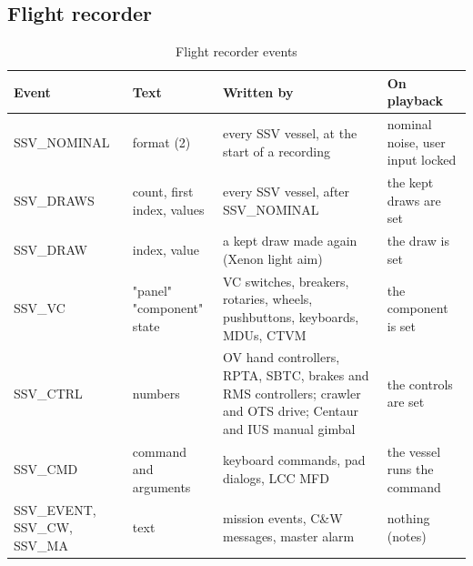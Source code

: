 \documentclass[Space_Shuttle_Vessel_Manual.tex]{subfiles}
\begin{document}
\subsection{Flight recorder}
\label{sec:flight-recorder}
\begin{table}[b!]
  \centering
  \begin{tabularx}{470pt}{>{\centering\arraybackslash}p{75pt} | >{\centering\arraybackslash}p{100pt} | >{\centering\arraybackslash}p{150pt} | >{\centering\arraybackslash}p{95pt}}
    \textbf{Event} & \textbf{Text} & \textbf{Written by} & \textbf{On playback} \\
    \hline
	SSV\_NOMINAL & format (2) & every SSV vessel, at the start of a recording & nominal noise, user input locked\\
	\hline\rule{0pt}{2ex}
	SSV\_DRAWS & count, first index, values & every SSV vessel, after SSV\_NOMINAL & the kept draws are set\\
	\hline\rule{0pt}{2ex}
	SSV\_DRAW & index, value & a kept draw made again (Xenon light aim) & the draw is set\\
	\hline\rule{0pt}{2ex}
	SSV\_VC & "panel" "component" state & VC switches, breakers, rotaries, wheels, pushbuttons, keyboards, MDUs, CTVM & the component is set\\
	\hline\rule{0pt}{2ex}
	SSV\_CTRL & numbers & OV hand controllers, RPTA, SBTC, brakes and RMS controllers; crawler and OTS drive; Centaur and IUS manual gimbal & the controls are set\\
	\hline\rule{0pt}{2ex}
	SSV\_CMD & command and arguments & keyboard commands, pad dialogs, LCC MFD & the vessel runs the command\\
	\hline\rule{0pt}{2ex}
	SSV\_EVENT, SSV\_CW, SSV\_MA & text & mission events, C\&W messages, master alarm & nothing (notes)
	\end{tabularx}
  \caption{Flight recorder events}
  \label{tab:FlightRecorderEvents}
\end{table}
\end{document}
